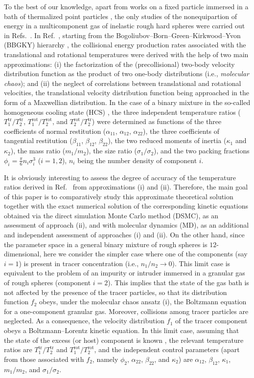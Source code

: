\documentclass[aps,pre,reprint]{revtex4-1}
\newcommand{\ds}{\sigma}
\newcommand{\esn}{\alpha}
\newcommand{\est}{\beta}
\newcommand{\q}{\kappa}
\newcommand{\Tt}{T^{\text{tr}}}
\newcommand{\Tr}{T^{\text{rot}}}
\begin{document}
To the best of our knowledge, apart from works  on a fixed particle immersed in a bath
of thermalized point particles \cite{VT04,CP08}, the only studies of the nonequipartion of energy in a multicomponent gas of inelastic rough hard spheres were carried out in Refs.\ \cite{SKG10,S11b}.
In Ref.\ \cite{SKG10}, starting from the
Bogoliubov--Born--Green--Kirkwood--Yvon (BBGKY) hierarchy \cite{BDS97},
the collisional energy production rates  associated with the
translational and rotational temperatures were derived with the help of two main
approximations: (i) the factorization of the (precollisional) two-body velocity
distribution function as the product of two one-body distributions (i.e.,
\emph{molecular chaos}); and (ii) the neglect of correlations between translational and rotational
velocities, the translational velocity distribution function being
approached in the form of a Maxwellian distribution. In the case of a binary mixture in
the so-called homogeneous cooling state (HCS) \cite{H83}, the three independent temperature ratios ($\Tt_1/\Tt_2$,  $\Tr_1/\Tr_2$, and $\Tr_2/\Tt_2$) were  determined as functions of the three
coefficients of normal restitution ($\esn_{11}$, $\esn_{12}$, $\esn_{22}$), the three coefficients of tangential
restitution ($\est_{11}$, $\est_{12}$, $\est_{22}$), the two reduced moments of inertia ($\q_1$ and $\q_2$), the mass ratio ($m_1/m_2$), the
size ratio ($\ds_1/\ds_2$), and the two packing fractions  $\phi_i =\frac{\pi}{6}n_i\sigma_i^3$ ($i=1,2$), $n_i$ being the number density of component $i$.

It is obviously interesting to assess the degree of accuracy of the temperature ratios derived in Ref.\ \cite{SKG10} from approximations (i)
and (ii). Therefore, the main goal of this paper is to comparatively
study this approximate theoretical solution together with the exact numerical solution of the
corresponding kinetic equations  obtained via the direct simulation Monte Carlo
method (DSMC), as an assessment of approach (ii), and with molecular
dynamics (MD), as an additional and independent assessment of approaches (i) and (ii). On the other hand, since the parameter space  in a general binary mixture of rough spheres is $12$-dimensional, here we consider the simpler case where one of the components (say $i=1$) is present in tracer concentration (i.e., $n_1/n_2\to 0$). This limit case is equivalent to the problem of an impurity or intruder immersed in a granular gas of rough spheres (component $i=2$). This implies that the state of the gas bath is not affected by the presence of the tracer particles, so that its distribution function $f_2$ obeys, under the molecular chaos ansatz (i),  the Boltzmann equation for a one-component granular gas. Moreover, collisions among tracer particles are neglected. As a consequence, the velocity distribution $f_1$ of the tracer component obeys a Boltzmann--Lorentz kinetic equation. In this limit case, assuming that the state of the excess (or host) component is known \cite{ML98,LHMZ98}, the relevant temperature ratios are $\Tt_1/\Tt_2$ and  $\Tr_1/\Tr_2$, and the independent control parameters (apart from those associated with $f_2$, namely  $\phi_2$, $\esn_{22}$, $\est_{22}$, and $\q_2$) are $\esn_{12}$, $\est_{12}$, $\q_1$, $m_1/m_2$, and $\ds_1/\ds_2$.
\end{document}
